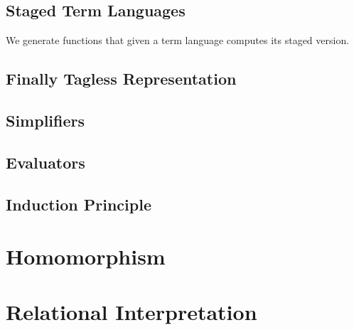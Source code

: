 \subsection{Staged Term Languages}
We generate functions that given a term language computes its staged version. 

\subsection{Finally Tagless Representation}

\subsection{Simplifiers}
\label{sec:generation:simplifier}

\subsection{Evaluators}
\label{sec:generation:evaluator}

\subsection{Induction Principle}
\label{sec:generation:induction}



\section{Homomorphism}

\section{Relational Interpretation}
\label{sec:generation:relInterp}


